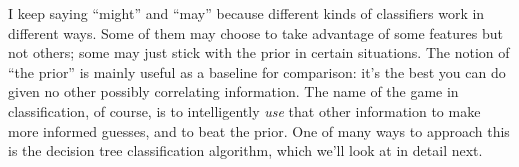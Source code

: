I keep saying ``might'' and ``may'' because different kinds of classifiers work
in different ways. Some of them may choose to take advantage of some features
but not others; some may just stick with the prior in certain situations. The
notion of ``the prior'' is mainly useful as a baseline for comparison: it's the
best you can do given no other possibly correlating information. The name of
the game in classification, of course, is to intelligently \textit{use} that
other information to make more informed guesses, and to beat the prior. One of
many ways to approach this is the decision tree classification algorithm, which
we'll look at in detail next.

